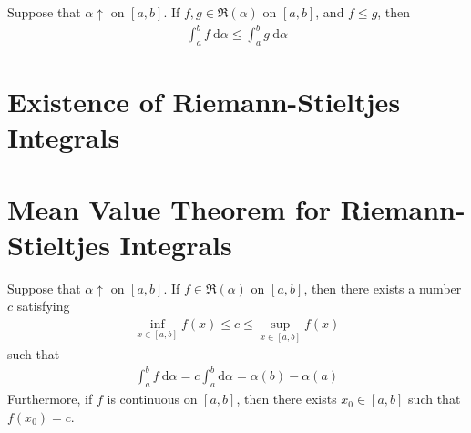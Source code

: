 \documentclass[thmcnt=section, 12pt]{elegantbook}
\begin{document}

\begin{theorem} \label{thm:26}
    Suppose that $\alpha \uparrow$ on $[a, b]$. If $f, g \in \mathfrak{R}(\alpha)$ on $[a, b]$, and $f \leq g$, then 
    \begin{align*}
        \int_a^b f \ \mathrm{d}\alpha
        \leq \int_a^b g \ \mathrm{d}\alpha
    \end{align*}
\end{theorem}


\section{Existence of Riemann-Stieltjes Integrals}


\section{Mean Value Theorem for Riemann-Stieltjes Integrals}


\begin{theorem} \label{thm:27}
    Suppose that $\alpha \uparrow$ on $[a, b]$. If $f \in \mathfrak{R}(\alpha)$ on $[a, b]$, then there exists a number $c$ satisfying
    \begin{align*}
        \inf_{x \in [a, b]} f(x) \leq c \leq \sup_{x \in [a, b]} f (x)
    \end{align*}
    such that 
    \begin{align}
        \int_a^b f \ \mathrm{d}\alpha
        = c \int_{a}^{b} \mathrm{d}\alpha
        = \alpha(b) - \alpha(a)
        \label{eq:58}
    \end{align}
    Furthermore, if $f$ is continuous on $[a, b]$, then there exists $x_0 \in [a, b]$ such that $f(x_0) = c$.
\end{theorem}
\end{document}
